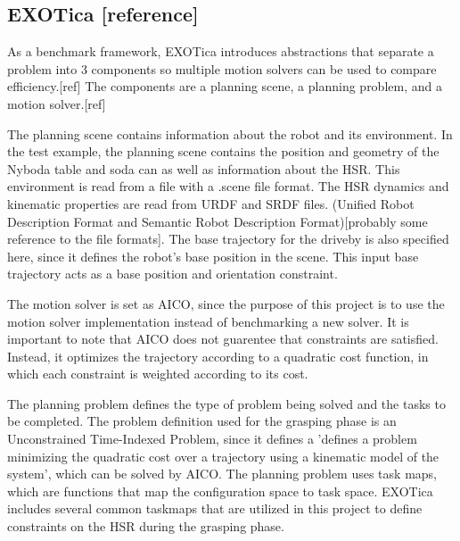 \documentclass[12pt]{article}
\begin{document}
        \subsection{EXOTica [reference]}
            As a benchmark framework, EXOTica introduces abstractions that separate a problem into 3 components so multiple motion solvers can be used to compare efficiency.[ref] The components are a planning scene, a planning problem, and a motion solver.[ref]
                
            \par The planning scene contains information about the robot and its environment. In the test example, the planning scene contains the position and geometry of the Nyboda table and soda can as well as information about the HSR. This environment is read from a file with a .scene file format. The HSR dynamics and kinematic properties are read from URDF and SRDF files. (Unified Robot Description Format and Semantic Robot Description Format)[probably some reference to the file formats]. The base trajectory for the driveby is also specified here, since it defines the robot's base position in the scene. This input base trajectory acts as a base position and orientation constraint.

            \par The motion solver is set as AICO, since the purpose of this project is to use the motion solver implementation instead of benchmarking a new solver. It is important to note that AICO does not guarentee that constraints are satisfied. Instead, it optimizes the trajectory according to a quadratic cost function, in which each constraint is weighted according to its cost.

            \par The planning problem defines the type of problem being solved and the tasks to be completed. The problem definition used for the grasping phase is an Unconstrained Time-Indexed Problem, since it defines a 'defines a problem minimizing the quadratic cost over a trajectory using a kinematic model of the system', which can be solved by AICO. The planning problem uses task maps, which are functions that map the configuration space to task space. EXOTica includes several common taskmaps that are utilized in this project to define constraints on the HSR during the grasping phase.
            
\end{document}
